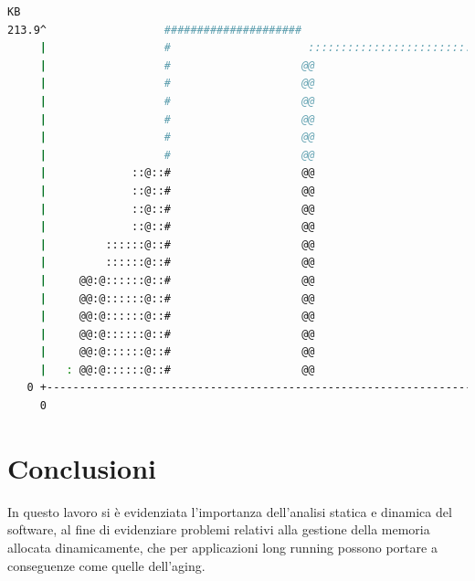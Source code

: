 \documentclass{article}
\begin{document}
\begin{lstlisting}[language=bash]
    KB
213.9^                  #####################                                 
     |                  #                     ::::::::::::::::::::::::::::::::
     |                  #                    @@                              :
     |                  #                    @@                              :
     |                  #                    @@                              :
     |                  #                    @@                              :
     |                  #                    @@                              :
     |                  #                    @@                              :
     |             ::@::#                    @@                              :
     |             ::@::#                    @@                              :
     |             ::@::#                    @@                              :
     |             ::@::#                    @@                              :
     |         ::::::@::#                    @@                              :
     |         ::::::@::#                    @@                              :
     |     @@:@::::::@::#                    @@                              :
     |     @@:@::::::@::#                    @@                              :
     |     @@:@::::::@::#                    @@                              :
     |     @@:@::::::@::#                    @@                              :
     |     @@:@::::::@::#                    @@                              :
     |   : @@:@::::::@::#                    @@                              :
   0 +----------------------------------------------------------------------->
     0                                                                   5.393
\end{lstlisting}


\newpage
\section{Conclusioni}

In questo lavoro si è evidenziata l'importanza dell'analisi statica e dinamica
del software, al fine di evidenziare problemi relativi alla gestione della
memoria allocata dinamicamente, che per applicazioni long running possono
portare a conseguenze come quelle dell'aging. \\
\end{document}

